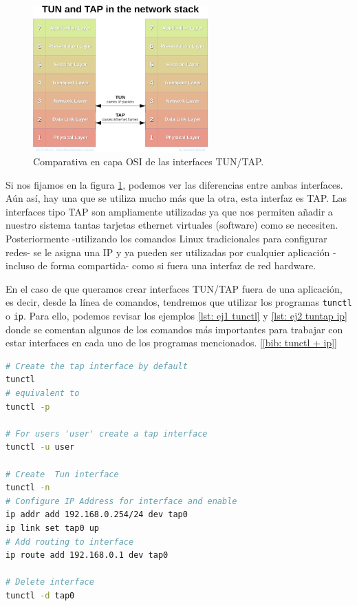 \documentclass[a4paper, oneside, 12pt]{book}
\begin{document}
	\vspace{5px}

	\begin{figure}[h!]
		\begin{center}
			\includegraphics[width=0.6\textwidth]{img/tun_vs_tap.png}
			\caption{Comparativa en capa OSI de las interfaces TUN/TAP.}
			\label{img: tun vs tap}
		\end{center}
	\end{figure}
	
	\noindent Si nos fijamos en la figura \ref{img: tun vs tap}, podemos ver las diferencias entre ambas interfaces. Aún así, hay una que se utiliza mucho más que la otra, esta interfaz es TAP. Las interfaces tipo TAP son ampliamente utilizadas ya que nos permiten añadir a nuestro sistema tantas tarjetas ethernet virtuales (software) como se necesiten. Posteriormente -utilizando los comandos Linux tradicionales para configurar redes- se le asigna una IP y ya pueden ser utilizadas por cualquier aplicación -incluso de forma compartida- como si fuera una interfaz de red hardware.
	
	\pagebreak
	
	\noindent En el caso de que queramos crear interfaces TUN/TAP fuera de una aplicación, es decir, desde la línea de comandos, tendremos que utilizar los programas \texttt{tunctl} o \texttt{ip}. Para ello, podemos revisar los ejemplos \ref{lst: ej1 tunctl} y \ref{lst: ej2 tuntap ip} donde se comentan algunos de los comandos más importantes para trabajar con estar interfaces en cada uno de los programas mencionados. [\ref{bib: tunctl + ip}]
	
	\vspace{10px}
	
	\begin{lstlisting}[language=Bash, label=lst: ej1 tunctl, caption=Ejemplo de uso de \texttt{tunctl} para controlar interfaces TUN/TAP]
# Create the tap interface by default
tunctl 
# equivalent to
tunctl -p

# For users 'user' create a tap interface
tunctl -u user

# Create  Tun interface
tunctl -n
# Configure IP Address for interface and enable
ip addr add 192.168.0.254/24 dev tap0
ip link set tap0 up
# Add routing to interface
ip route add 192.168.0.1 dev tap0

# Delete interface
tunctl -d tap0
	\end{lstlisting}
\end{document}
